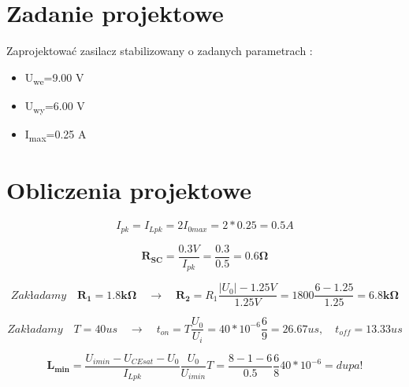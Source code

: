 \documentclass[a4paper,12pt]{article}
\begin{document}
\section{Zadanie projektowe}
Zaprojektować zasilacz stabilizowany o zadanych parametrach :
\begin{itemize}
\item U\textsubscript{we}=9.00 V
\item U\textsubscript{wy}=6.00 V
\item I\textsubscript{max}=0.25 A
\end{itemize}
\section{Obliczenia projektowe}

\begin{equation}
I_{pk}=I_{Lpk}=2I_{0max}=2*0.25=0.5 A
\end{equation}

\begin{equation}
\mathbf{R_{SC}}=\frac{0.3V}{I_{pk}}=\frac{0.3}{0.5}=\mathbf{0.6 \Omega}
\end{equation}

\begin{equation}
Zakładamy \quad \mathbf{R_1=1.8k\Omega}   \quad \to \quad   \mathbf{R_2}=R_1 \frac {|U_0|-1.25V}{1.25V} = 1800\frac{6-1.25}{1.25}= \mathbf{6.8k \Omega}
\end{equation}

\begin{equation}
Zakładamy \quad T=40us \quad \to \quad t_{on}=T\frac{U_0}{U_i}=40*10^{-6}\frac{6}{9}=26.67us, \quad t_{off}=13.33us
\end{equation}

\begin{equation}
\mathbf{L_{min}}=\frac{U_{imin}-U_{CEsat}-U_0}{I_{Lpk}} \frac{U_0}{U_{imin}}T=\frac{8-1-6}{0.5} \frac{6}{8}40*10^{-6}=dupa!
\end{equation}

\end{document}
